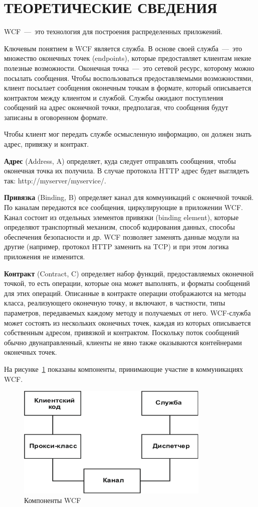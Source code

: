 \section{ТЕОРЕТИЧЕСКИЕ СВЕДЕНИЯ}

WCF~---~это технология для построения распределенных приложений.

Ключевым понятием в WCF является служба.
В основе своей служба~---~это множество оконечных точек (endpoints),
которые предоставляет клиентам некие полезные возможности.
Оконечная точка~---~это сетевой ресурс, которому можно посылать сообщения.
Чтобы воспользоваться предоставляемыми возможностями, 
клиент посылает сообщения оконечным точкам в формате,
который описывается контрактом между клиентом и службой.
Службы ожидают поступления сообщений на адрес оконечной точки,
предполагая, что сообщения будут записаны в оговоренном формате.

Чтобы клиент мог передать службе осмысленную информацию, он
должен знать адрес, привязку и контракт.

\textbf{Адрес} (Address, A) определяет, куда следует отправлять сообщения,
чтобы оконечная точка их получила. В случае протокола HTTP адрес будет
выглядеть так: http://myserver/myservice/.

\textbf{Привязка} (Binding, B) определяет канал для коммуникаций с оконечной
точкой. По каналам передаются все сообщения, циркулирующие в приложении
WCF. Канал состоит из отдельных элементов привязки (binding element),
которые определяют транспортный механизм, способ кодирования данных,
способы обеспечения безопасности и др. WCF позволяет заменять данные
модули на другие (например, протокол HTTP заменить на TCP) и при этом
логика приложения не изменится.

\textbf{Контракт} (Contract, C) определяет набор функций, предоставляемых
оконечной точкой, то есть операции, которые она может выполнять, и форматы
сообщений для этих операций. Описанные в контракте операции отображаются
на методы класса, реализующего оконечную точку, и включают, в частности,
типы параметров, передаваемых каждому методу и получаемых от него.
WCF-служба может состоять из нескольких оконечных точек, каждая из
которых описывается собственным адресом, привязкой и контрактом.
Поскольку поток сообщений обычно двунаправленный, клиенты не явно также
оказываются контейнерами оконечных точек.

На рисунке~\ref{pic:wcf_components} показаны компоненты, принимающие участие в коммуникациях WCF.

\begin{figure}[h!]
  \centering
  \includegraphics[width=92mm]{pic/wcf_components}
  \caption{Компоненты WCF}
  \label{pic:wcf_components}
\end{figure}

